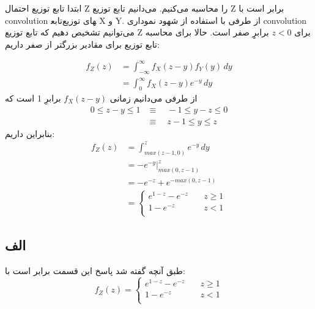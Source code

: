 ابتدا تابع توزیع احتمال Z را محاسبه می‌کنیم. می‌دانیم تابع توزیع Z برابر است با convolution تابع‎های توزیع X و Y. از طرفی با استفاده از شهود نموداری convolution می‌توانیم تشخیص دهیم که تابع توزیع Z برای 
$ z < 0 $
برابرِِ صفر است. حالا برای محاسبه تابع توزیع برای مقادیر بزرگتر از صفر داریم:

\begin{align*}
	f_Z(z) &= \int_{-\infty}^{\infty} f_X(z - y)f_Y(y) \, dy \\
	&= \int_{0}^{\infty} f_X(z - y)e^{-y} \, dy
\end{align*}
از طرفی می‌دانیم زمانی 
$f_X(z - y)$
برابرِ 1 است که
\begin{align*}
0  \le z - y \le 1
&\equiv \quad -1 \le y-z \le 0 \\ 
&\equiv \quad z - 1 \le y \le z 
\end{align*}
بنابراین داریم:
\begin{align*}
f_Z(z)
&= \int_{max(z - 1, 0)}^{z} e^{-y} \, dy \\
&= -e^{-y} |_{max(0, z-1)}^{z} \\
&= -e^{-z} + e^{-max(0, z-1)} \\
&= 
\begin{cases}
	e^{1 - z} - e^{-z} & \quad z \ge 1 \\
	1 - e^{-z} & \quad z < 1 \\
\end{cases}
\end{align*}


\subsection*{الف}
طبق آنچه گفته شد پاسخ این قسمت برابر است با:
$$
f_Z(z) =
\begin{cases}
	e^{1 - z} - e^{-z} & \quad z \ge 1 \\
	1 - e^{-z} & \quad z < 1 \\
\end{cases}
$$

